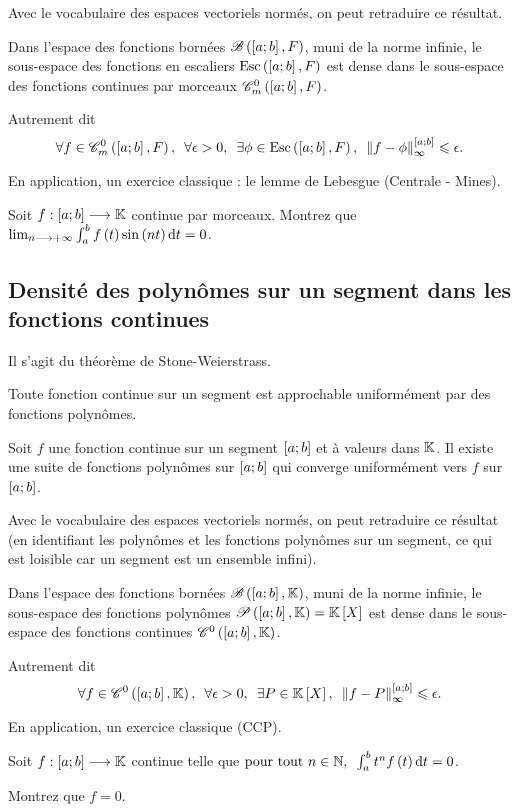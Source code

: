 Avec le vocabulaire des espaces vectoriels normés, on peut retraduire ce résultat.

\begin{prop}
Dans l'espace des fonctions bornées \(\fonctionsbornees[\intervii{a}{b}][F]\), muni de la norme infinie, le sous-espace des fonctions en escaliers \(\Esc[\intervii{a}{b}][F]\) est dense dans le sous-espace des fonctions continues par morceaux \(\contm[\intervii{a}{b}][F]\).

Autrement dit \[\quantifs{\forall f\in\contm[\intervii{a}{b}][F];\forall\epsilon>0;\exists\phi\in\Esc[\intervii{a}{b}][F]}\norme{f-\phi}_\infty^{\intervii{a}{b}}\leq\epsilon.\]
\end{prop}

En application, un exercice classique : le lemme de Lebesgue (Centrale - Mines).

\begin{exo}
Soit \(f:\left[a;b\right]\longrightarrow\mathbb{K}\) continue par morceaux. Montrez que \(\lim_{n\to\pinf}\int_a^bf\paren{t}\sin\paren{nt}\odif{t}=0\).
\end{exo}

\subsection{Densité des polynômes sur un segment dans les fonctions continues}

Il s'agit du théorème de Stone-Weierstrass.

\begin{theo}
Toute fonction continue sur un segment est approchable uniformément par des fonctions polynômes.

Soit \(f\) une fonction continue sur un segment \(\left[a;b\right]\) et à valeurs dans \(\mathbb{K}\). Il existe une suite de fonctions polynômes sur \(\left[a;b\right]\) qui converge uniformément vers \(f\) sur \(\left[a;b\right]\).
\end{theo}

Avec le vocabulaire des espaces vectoriels normés, on peut retraduire ce résultat (en identifiant les polynômes et les fonctions polynômes sur un segment, ce qui est loisible car un segment est un ensemble infini).

\begin{prop}
Dans l'espace des fonctions bornées \(\fonctionsbornees[\intervii{a}{b}][\K]\), muni de la norme infinie, le sous-espace des fonctions polynômes \(\fonctionspolynomes[\intervii{a}{b}][\K]=\poly\) est dense dans le sous-espace des fonctions continues \(\mathscr{C}^{0}\left(\left[a;b\right],\mathbb{K}\right)\).

Autrement dit \[\quantifs{\forall f\in\ensclasse{0}{\intervii{a}{b}}{\K};\forall\epsilon>0;\exists P\in\poly}\norme{f-P}_\infty^{\intervii{a}{b}}\leq\epsilon.\]
\end{prop}

En application, un exercice classique (CCP).

\begin{exo}
Soit \(f:\left[a;b\right]\longrightarrow\mathbb{K}\) continue telle que \(\quantifs{\tpt n\in\N}\int_a^bt^nf\paren{t}\odif{t}=0\).

Montrez que \(f=0\).
\end{exo}
